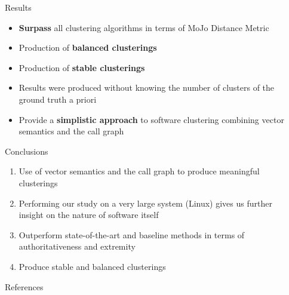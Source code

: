 \documentclass[final]{beamer}
\newlength{\sepwidth}
\newlength{\colwidth}
\newcommand{\separatorcolumn}{\begin{column}{\sepwidth}\end{column}}
\begin{document}
\begin{frame}[t]
\begin{columns}[t]
\begin{column}{\colwidth}
\begin{block}{Results}
	\begin{itemize}
		\justifying
    \item \textbf{Surpass} all clustering algorithms in terms of MoJo Distance Metric
    \item Production of \textbf{balanced clusterings}
    \item Production of \textbf{stable clusterings}
    \item Results were produced without knowing the number of clusters of the ground truth a priori
    \item Provide a \textbf{simplistic approach} to software clustering combining vector semantics and the call graph
	\end{itemize}
	


  \end{block}

	\begin{alertblock}{Conclusions}
	\begin{enumerate}
	\justifying
    \item Use of vector semantics and the call graph to produce meaningful clusterings
    \item Performing our study on a very large system (Linux) gives us further insight on the nature of software itself
    \item Outperform state-of-the-art and baseline methods in terms of authoritativeness and extremity
    \item Produce stable and balanced clusterings 
\end{enumerate}

	
		
	\end{alertblock}


  \begin{block}{References}
	
    \scriptsize{}

  \end{block}

\end{column}

\separatorcolumn
\end{columns}
\end{frame}
\end{document}
